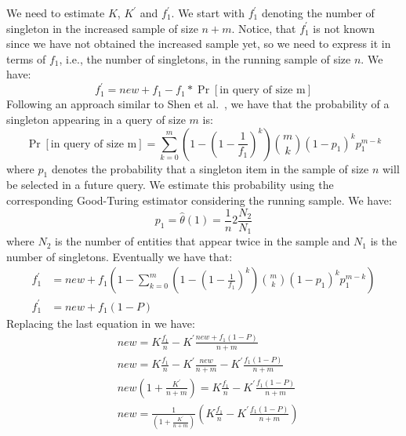 We need to estimate $K$, $K^{\prime}$ and $f^{\prime}_1$. We start with $f^{\prime}_1$ denoting the number of singleton in the increased sample of size $n+m$. Notice, that $f^{\prime}_1$ is not known since we have not obtained the increased sample yet, so we need to express it in terms of $f_1$, i.e., the number of singletons, in the running sample of size $n$. We have:
\begin{equation}
f^{\prime}_1 = new + f_1 - f_1*\Pr[\mbox{in query of size m}]
\end{equation}
Following an approach similar to Shen et al.~\cite{shen:2003}, we have that the probability of a singleton appearing in a query of size $m$ is:
\begin{equation}
\Pr[\mbox{in query of size m}] = \sum_{k=0}^m(1-(1-\frac{1}{f_1})^k) {m \choose k}(1-p_1)^k p_1^{m-k}
\end{equation}
where $p_1$ denotes the probability that a singleton item in the sample of size $n$ will be selected in a future query. We estimate this probability using the corresponding Good-Turing estimator considering the running sample. We have:
\begin{equation}
p_1 = \hat{\theta}(1) = \frac{1}{n}2\frac{N_2}{N_1}
\end{equation} 
where $N_2$ is the number of entities that appear twice in the sample and $N_1$ is the number of singletons. 
Eventually we have that:
\begin{align}
f^{\prime}_1 &= new + f_1(1- \sum_{k=0}^m(1-(1-\frac{1}{f_1})^k) {m \choose k}(1-p_1)^k p_1^{m-k}) \nonumber \\
f^{\prime}_1 &= new + f_1(1- P)
\end{align}
Replacing the last equation in  we have:
\begin{align}
&new = K\frac{f_1}{n} - K^{\prime}\frac{new + f_1(1- P)}{n+m} \nonumber \\
&new = K\frac{f_1}{n} - K^{\prime}\frac{new}{n+m} - K^{\prime}\frac{f_1(1- P)}{n+m} \nonumber \\
&new(1 + \frac{K^{\prime}}{n+m}) = K\frac{f_1}{n} - K^{\prime}\frac{f_1(1- P)}{n+m} \nonumber \\
&new = \frac{1}{(1 + \frac{K^{\prime}}{n+m})}(K\frac{f_1}{n} - K^{\prime}\frac{f_1(1- P)}{n+m}) \nonumber
\end{align}


